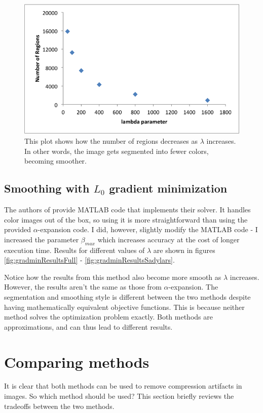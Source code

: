 \documentclass[10pt,twocolumn,letterpaper]{article}
\begin{document}
\begin{figure}
\includegraphics[width=\linewidth]{alphaResults/alphaResultGraph.png}
\caption{This plot shows how the number of regions decreases as $\lambda$ increases. In other words, the image gets segmented into fewer colors, becoming smoother.}
\label{fig:alphaPlot}
\end{figure}

\subsection{Smoothing with $L_0$ gradient minimization}
The authors of \cite{xu2011image} provide MATLAB code that implements their solver. It handles color images out of the box, so using it is more straightforward than using the provided $\alpha$-expansion code. I did, however, slightly modify the MATLAB code - I increased the parameter $\beta_{max}$ which increases accuracy at the cost of longer execution time. Results for different values of $\lambda$ are shown in figures \ref{fig:gradminResultsFull} - \ref{fig:gradminResultsSadylars}.

Notice how the results from this method also become more smooth as $\lambda$ increases. However, the results aren't the same as those from $\alpha$-expansion. The segmentation and smoothing style is different between the two methods despite having mathematically equivalent objective functions. This is because neither method solves the optimization problem exactly. Both methods are approximations, and can thus lead to different results.

\section{Comparing methods}
It is clear that both methods can be used to remove compression artifacts in images. So which method should be used? This section briefly reviews the tradeoffs between the two methods.
\end{document}
